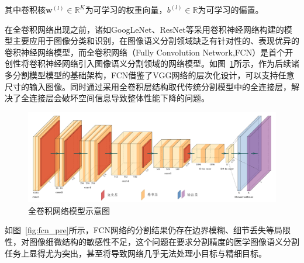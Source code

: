 其中卷积核$ \boldsymbol{w}^{(l)} \in \mathbb{R}^{K} $为可学习的权重向量，$b^{(l)} \in \mathbb{R}$为可学习的偏置\cite{qiu2020nndl}。

在全卷积网络出现之前，诸如GoogLeNet、ResNet等采用卷积神经网络构建的模型主要应用于图像分类和识别，在图像语义分割领域缺乏有针对性的、表现优异的卷积神经网络模型，而全卷积网络\cite{shelhamer2016}（Fully Convolution Network,FCN）是首个开创性将卷积神经网络引入图像语义分割领域的网络模型。如图~\ref{fig:fcn_frame}所示，作为后续诸多分割模型模型的基础架构，FCN借鉴了VGG网络的层次化设计，可以支持任意尺寸的输入图像。同时通过采用全卷积层结构取代传统分割模型中的全连接层，解决了全连接层会破坏空间信息导致整体性能下降的问题。

\begin{figure}[htbp]
    \centering
    \includegraphics[width=\textwidth]{fig/fcn_frame.png}
    \caption{全卷积网络模型示意图}
    \label{fig:fcn_frame}
\end{figure}

如图~\ref{fig:fcn_pre}所示，FCN网络的分割结果仍存在边界模糊、细节丢失等局限性，对图像细微结构的敏感性不足，这个问题在要求分割精度的医学图像语义分割任务上显得尤为突出，甚至将导致网络几乎无法处理小目标与精细目标。

